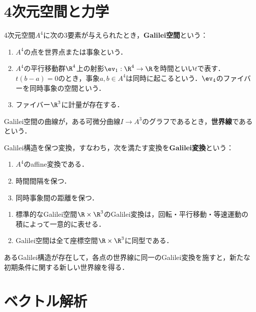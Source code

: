 \documentclass[uplatex,dvipdfmx]{jsreport}
\begin{document}
\section{4次元空間と力学}

\begin{definition}
    4次元空間$A^4$に次の3要素が与えられたとき，\textbf{Galilei空間}という：
    \begin{enumerate}
        \item $A^4$の点を世界点または事象という．
        \item $A^4$の平行移動群$\R^4$上の射影$\ev_1:\R^4\to\R$を時間といい$t$で表す．
        $t(b-a)=0$のとき，事象$a,b\in A^4$は同時に起こるという．$\ev_4$のファイバーを同時事象の空間という．
        \item ファイバー$\R^3$に計量が存在する．
    \end{enumerate}
    Galilei空間の曲線が，ある可微分曲線$I\to A^3$のグラフであるとき，\textbf{世界線}であるという．
\end{definition}
\begin{definition}
    Galilei構造を保つ変換，すなわち，次を満たす変換を\textbf{Galilei変換}という：
    \begin{enumerate}
        \item $A^4$のaffine変換である．
        \item 時間間隔を保つ．
        \item 同時事象間の距離を保つ．
    \end{enumerate}
\end{definition}

\begin{lemma}\mbox{}
    \begin{enumerate}
        \item 標準的なGalilei空間$\R\times\R^3$のGalilei変換は，回転・平行移動・等速運動の積によって一意的に表せる．
        \item Galilei空間は全て座標空間$\R\times\R^3$に同型である．
    \end{enumerate}
\end{lemma}

\begin{axiom}[Galileiの相対性原理]
    あるGalilei構造が存在して，各点の世界線に同一のGalilei変換を施すと，新たな初期条件に関する新しい世界線を得る．
\end{axiom}

\section{ベクトル解析}
\end{document}
